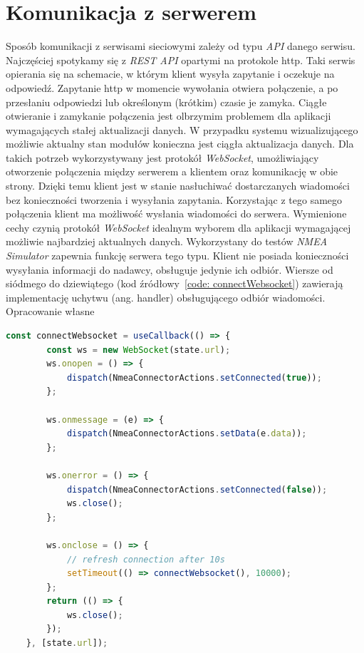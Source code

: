 \documentclass[skorowidz,skroty]{dyplomWEZUT}
\begin{document}
\section{Komunikacja z serwerem}\label{sec: server communication} 
Sposób komunikacji z serwisami sieciowymi zależy od typu \textit{API} danego serwisu. Najczęściej spotykamy się z \textit{REST API} opartymi na protokole http. Taki serwis opierania się na schemacie, w którym klient wysyła zapytanie i oczekuje na odpowiedź. Zapytanie http w momencie wywołania otwiera połączenie, a po przesłaniu odpowiedzi lub określonym (krótkim) czasie je zamyka. Ciągłe otwieranie i zamykanie połączenia jest olbrzymim problemem dla aplikacji wymagających stałej aktualizacji danych. W przypadku systemu wizualizującego możliwie aktualny stan modułów konieczna jest ciągła aktualizacja danych. Dla takich potrzeb wykorzystywany jest protokół \textit{WebSocket}, umożliwiający otworzenie połączenia między serwerem a klientem oraz komunikację w obie strony. Dzięki temu klient jest w stanie nasłuchiwać dostarczanych wiadomości bez konieczności tworzenia i wysyłania zapytania. Korzystając z tego samego połączenia klient ma możliwość wysłania wiadomości do serwera. Wymienione cechy czynią protokół \textit{WebSocket} idealnym wyborem dla aplikacji wymagającej możliwie najbardziej aktualnych danych. Wykorzystany do testów \textit{NMEA Simulator} zapewnia funkcję serwera tego typu. Klient nie posiada konieczności wysyłania informacji do nadawcy, obsługuje jedynie ich odbiór. Wiersze od siódmego do dziewiątego (kod źródłowy~\ref{code: connectWebsocket}) zawierają implementację uchytwu (ang. handler) obsługującego odbiór wiadomości.
{Opracowanie własne}{\label{code: connectWebsocket}}
\begin{lstlisting}[language=JavaScript]
  const connectWebsocket = useCallback(() => {
        const ws = new WebSocket(state.url);
        ws.onopen = () => {
            dispatch(NmeaConnectorActions.setConnected(true));
        };

        ws.onmessage = (e) => {
            dispatch(NmeaConnectorActions.setData(e.data));
        };

        ws.onerror = () => {
            dispatch(NmeaConnectorActions.setConnected(false));
            ws.close();
        };

        ws.onclose = () => {
            // refresh connection after 10s
            setTimeout(() => connectWebsocket(), 10000);
        };
        return (() => {
            ws.close();
        });
    }, [state.url]);    
    
\end{lstlisting}
\end{document}
